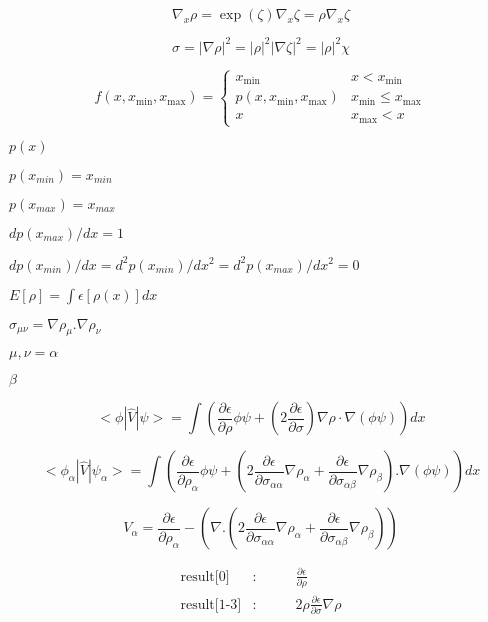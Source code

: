 \documentclass{article}
\begin{document}
\[
\nabla_x\rho = \exp(\zeta)\nabla_x\zeta = \rho \nabla_x\zeta
\]
\pagebreak

\[
  \sigma = |\nabla\rho|^2 = |\rho|^2 |\nabla\zeta|^2 = |\rho|^2 \chi
\]
\pagebreak

\[
f(x,x_{\mathrm{min}},x_{\mathrm{max}}) = \left\{
  \begin{array}{ll}
    x_{\mathrm{min}}                       & x < x_{\mathrm{min}} \\
    p(x,x_{\mathrm{min}},x_{\mathrm{max}}) & x_{\mathrm{min}} \leq x_{\mathrm{max}} \\
    x                                      & x_{\mathrm{max}} < x
  \end{array}
\right.
\]
\pagebreak

$p(x)$
\pagebreak

$p(x_{min})=x_{min}$
\pagebreak

$p(x_{max})=x_{max}$
\pagebreak

$dp(x_{max})/dx=1$
\pagebreak

$dp(x_{min})/dx=d^2p(x_{min})/dx^2=d^2p(x_{max})/dx^2=0$
\pagebreak

$ E[\rho] = \int \epsilon[\rho(x)] dx$
\pagebreak

$ \sigma_{\mu \nu} = \nabla \rho_{\mu} . \nabla \rho_{\nu} $
\pagebreak

$ \mu, \nu = \alpha$
\pagebreak

$ \beta $
\pagebreak

\[
  < \phi | \hat V | \psi > = \int \left( \frac{\partial \epsilon}{\partial \rho} \phi \psi
                 +  \left( 2 \frac{\partial \epsilon}{\partial \sigma} \right)
                 \nabla \rho \cdot \nabla \left( \phi \psi \right) \right) dx
\]
\pagebreak

\[
  < \phi_{\alpha} | \hat V | \psi_{\alpha} > = \int \left( \frac{\partial \epsilon}{\partial \rho_{\alpha}} \phi \psi
           +  \left( 2 \frac{\partial \epsilon}{\partial \sigma_{\alpha \alpha}} \nabla \rho_{\alpha}
           + \frac{\partial \epsilon}{\partial \sigma_{\alpha \beta}} \nabla \rho_{\beta}  \right) . \nabla \left( \phi \psi \right) \right) dx
\]
\pagebreak

\[
   V_{\alpha} =  \frac{\partial \epsilon}{\partial \rho_{\alpha}}
                 - \left(\nabla . \left(2 \frac{\partial \epsilon}{\partial \sigma_{\alpha \alpha}} \nabla \rho_{\alpha}
                 + \frac{\partial \epsilon}{\partial \sigma_{\alpha \beta}} \nabla \rho_{\beta}  \right)  \right)
\]
\pagebreak

\begin{eqnarray*}
    \mbox{result[0]}    &:& \qquad \frac{\partial \epsilon}{\partial \rho} \\
    \mbox{result[1-3]}  &:& \qquad 2 \rho \frac{\partial \epsilon}{\partial \sigma} \nabla\rho
\end{eqnarray*}
\pagebreak
\end{document}
